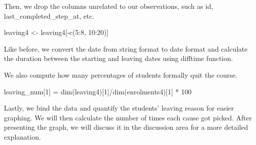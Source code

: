 \documentclass[12pt,]{article}
\newenvironment{Shaded}{\begin{snugshade}}{\end{snugshade}}
\newcommand{\AttributeTok}[1]{\textcolor[rgb]{0.77,0.63,0.00}{#1}}
\newcommand{\DecValTok}[1]{\textcolor[rgb]{0.00,0.00,0.81}{#1}}
\newcommand{\FunctionTok}[1]{\textcolor[rgb]{0.00,0.00,0.00}{#1}}
\newcommand{\NormalTok}[1]{#1}
\newcommand{\OtherTok}[1]{\textcolor[rgb]{0.56,0.35,0.01}{#1}}
\newcommand{\SpecialCharTok}[1]{\textcolor[rgb]{0.00,0.00,0.00}{#1}}
\newcommand{\StringTok}[1]{\textcolor[rgb]{0.31,0.60,0.02}{#1}}
\begin{document}
Then, we drop the columns unrelated to our observations, such as id,
last\_completed\_step\_at, etc.

\begin{Shaded}
\begin{Highlighting}[]
\NormalTok{leaving4 }\OtherTok{\textless{}{-}}\NormalTok{ leaving4[}\SpecialCharTok{{-}}\FunctionTok{c}\NormalTok{(}\DecValTok{5}\SpecialCharTok{:}\DecValTok{8}\NormalTok{, }\DecValTok{10}\SpecialCharTok{:}\DecValTok{20}\NormalTok{)]}
\end{Highlighting}
\end{Shaded}

Like before, we convert the date from string format to date format and
calculate the duration between the starting and leaving dates using
difftime function.

\begin{Shaded}
\end{Shaded}

We also compute how many percentages of students formally quit the
course.

\begin{Shaded}
\begin{Highlighting}[]
\NormalTok{leaving\_num[}\DecValTok{1}\NormalTok{] }\OtherTok{=} \FunctionTok{dim}\NormalTok{(leaving4)[}\DecValTok{1}\NormalTok{]}\SpecialCharTok{/}\FunctionTok{dim}\NormalTok{(enrolments4)[}\DecValTok{1}\NormalTok{] }\SpecialCharTok{*} \DecValTok{100}
\end{Highlighting}
\end{Shaded}

Lastly, we bind the data and quantify the students' leaving reason for
easier graphing. We will then calculate the number of times each cause
got picked. After presenting the graph, we will discuss it in the
discussion area for a more detailed explanation.
\end{document}
